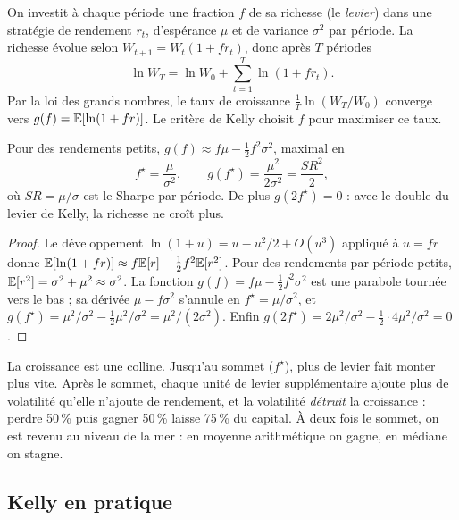 On investit à chaque période une fraction $f$ de sa richesse (le \emph{levier}) dans une stratégie de rendement $r_t$, d'espérance $\mu$ et de variance $\sigma^2$ par période. La richesse évolue selon $W_{t+1} = W_t(1 + f r_t)$, donc après $T$ périodes
\[
\ln W_T = \ln W_0 + \sum_{t=1}^{T}\ln(1 + f r_t).
\]
Par la loi des grands nombres, le taux de croissance $\frac1T\ln(W_T/W_0)$ converge vers $g(f) = \mathbb{E}[\ln(1+fr)]$. Le critère de Kelly \citep{kelly1956} choisit $f$ pour maximiser ce taux.

\begin{proposition}\label{c17:prop:kelly}
Pour des rendements petits, $g(f) \approx f\mu - \tfrac12 f^2\sigma^2$, maximal en
\[
f^\star = \frac{\mu}{\sigma^2}, \qquad g(f^\star) = \frac{\mu^2}{2\sigma^2} = \frac{SR^2}{2},
\]
où $SR = \mu/\sigma$ est le Sharpe par période. De plus $g(2f^\star) = 0$ : avec le double du levier de Kelly, la richesse ne croît plus.
\end{proposition}
\begin{proof}
Le développement $\ln(1+u) = u - u^2/2 + O(u^3)$ appliqué à $u = fr$ donne $\mathbb{E}[\ln(1+fr)] \approx f\mathbb{E}[r] - \tfrac12 f^2\mathbb{E}[r^2]$. Pour des rendements par période petits, $\mathbb{E}[r^2] = \sigma^2 + \mu^2 \approx \sigma^2$. La fonction $g(f) = f\mu - \tfrac12 f^2\sigma^2$ est une parabole tournée vers le bas ; sa dérivée $\mu - f\sigma^2$ s'annule en $f^\star = \mu/\sigma^2$, et $g(f^\star) = \mu^2/\sigma^2 - \tfrac12\mu^2/\sigma^2 = \mu^2/(2\sigma^2)$. Enfin $g(2f^\star) = 2\mu^2/\sigma^2 - \tfrac12\cdot4\mu^2/\sigma^2 = 0$.
\end{proof}

\begin{intuition}
La croissance est une colline. Jusqu'au sommet ($f^\star$), plus de levier fait monter plus vite. Après le sommet, chaque unité de levier supplémentaire ajoute plus de volatilité qu'elle n'ajoute de rendement, et la volatilité \emph{détruit} la croissance : perdre 50\,\% puis gagner 50\,\% laisse 75\,\% du capital. À deux fois le sommet, on est revenu au niveau de la mer : en moyenne arithmétique on gagne, en médiane on stagne.
\end{intuition}

\subsection{Kelly en pratique}

